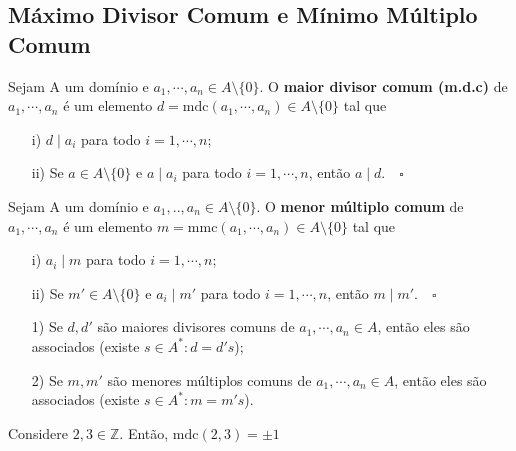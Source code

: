 \documentclass[algebraII_notes.tex]{subfiles}
\begin{document}
\subsection{Máximo Divisor Comum e Mínimo Múltiplo Comum}
\begin{def*}
	Sejam A um domínio e \(a_{1}, \cdots, a_{n}\in A\setminus{\{0\}}\). O \textbf{maior divisor comum (m.d.c)} de \(a_{1}, \cdots, a_{n}\)
	é um elemento \(d = \mathrm{mdc}(a_{1}, \cdots, a_{n})\in A\setminus{\{0\}}\) tal que
	\begin{itemize}
		\item[i)] \(d\mid a_{i}\) para todo \(i = 1, \cdots, n;\)
		\item[ii)] Se \(a\in A\setminus{\{0\}}\) e \(a\mid a_{i}\) para todo \(i=1, \cdots, n\), então \(a\mid d.\quad\square\)
	\end{itemize}
\end{def*}
\begin{def*}
	Sejam A um domínio e \(a_{1}, . ., a_{n}\in A\setminus{\{0\}}\). O \textbf{menor múltiplo comum} de \(a_{1}, \cdots, a_{n}\) é um elemento
	\(m = \mathrm{mmc}(a_{1}, \cdots, a_{n})\in A\setminus{\{0\}}\) tal que
	\begin{itemize}
		\item[i)] \(a_{i}\mid m\) para todo \(i=1, \cdots, n\);
		\item[ii)] Se \(m'\in A\setminus{\{0\}}\) e \(a_{i}\mid m'\) para todo \(i=1, \cdots, n\), então \(m\mid m'.\quad\square\)
	\end{itemize}
\end{def*}
\begin{prop*}
	\begin{itemize}
		\item[1)] Se \(d, d'\) são maiores divisores comuns de \(a_{1}, \cdots, a_{n}\in A\), então eles são associados (existe \(s\in A^{*}: d = d's\));
		\item[2)] Se \(m, m'\) são menores múltiplos comuns de \(a_{1}, \cdots, a_{n}\in A\), então eles são associados (existe \(s\in A^{*}: m = m's\)).
	\end{itemize}
\end{prop*}
\begin{example}
	Considere \(2, 3\in \mathbb{Z}.\) Então, \(\mathrm{mdc}(2, 3) = \pm1\)
\end{example}
\end{document}
